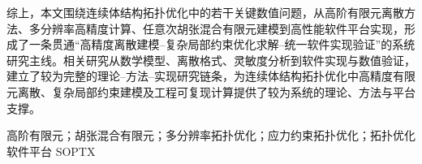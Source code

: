 \begin{cnabstract}
综上，本文围绕连续体结构拓扑优化中的若干关键数值问题，从高阶有限元离散方法、多分辨率高精度计算、任意次胡张混合有限元建模到高性能软件平台实现，形成了一条贯通“高精度离散建模--复杂局部约束优化求解--统一软件实现验证”的系统研究主线。相关研究从数学模型、离散格式、灵敏度分析到软件实现与数值验证，建立了较为完整的理论--方法--实现研究链条，为连续体结构拓扑优化中高精度有限元离散、复杂局部约束建模及工程可复现计算提供了较为系统的理论、方法与平台支撑。

\end{cnabstract}

\begin{cnkeywords}
高阶有限元；胡张混合有限元；多分辨率拓扑优化；应力约束拓扑优化；拓扑优化软件平台 SOPTX
\end{cnkeywords}

\newpage
